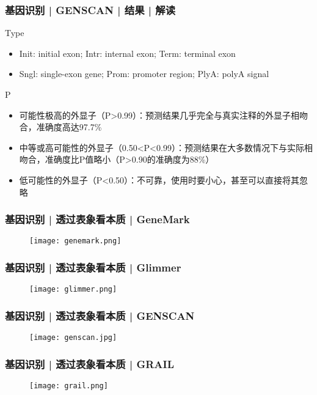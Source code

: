 \begin{frame}
  \frametitle{基因识别 | GENSCAN | 结果 | \alert{解读}}
  \begin{block}{Type}
    \begin{itemize}
      \item Init: initial exon; Intr: internal exon; Term: terminal exon
      \item Sngl: single-exon gene; Prom: promoter region; PlyA: polyA signal
    \end{itemize}
  \end{block}
  \pause
  \begin{block}{P}
  \begin{itemize}
    \item 可能性极高的外显子（P>0.99）：预测结果几乎完全与真实注释的外显子相吻合，准确度高达97.7\%
    \item 中等或高可能性的外显子（0.50<P<0.99）：预测结果在大多数情况下与实际相吻合，准确度比P值略小（P>0.90的准确度为88\%）
    \item 低可能性的外显子（P<0.50）：不可靠，使用时要小心，甚至可以直接将其忽略
  \end{itemize}
  \end{block}
\end{frame}

\begin{frame}
  \frametitle{基因识别 | 透过表象看本质 | GeneMark}
  \begin{figure}
    \centering
    \texttt{[image: genemark.png]}
  \end{figure}
\end{frame}

\begin{frame}
  \frametitle{基因识别 | 透过表象看本质 | Glimmer}
  \begin{figure}
    \centering
    \texttt{[image: glimmer.png]}
  \end{figure}
\end{frame}

\begin{frame}
  \frametitle{基因识别 | 透过表象看本质 | GENSCAN}
  \begin{figure}
    \centering
    \texttt{[image: genscan.jpg]}
  \end{figure}
\end{frame}

\begin{frame}
  \frametitle{基因识别 | 透过表象看本质 | GRAIL}
  \begin{figure}
    \centering
    \texttt{[image: grail.png]}
  \end{figure}
\end{frame}

